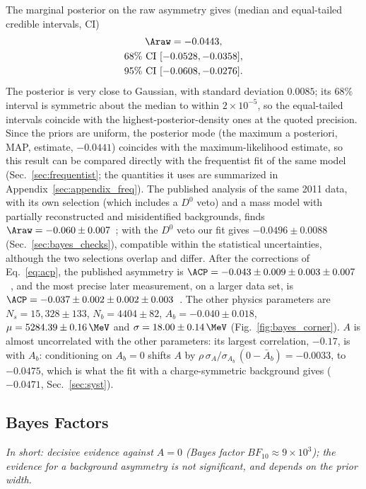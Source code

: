 The marginal posterior on the raw asymmetry gives (median and equal-tailed credible intervals, CI)
\begin{gather*}
\Araw = -0.0443, \\
68\%~\text{CI}~[-0.0528,-0.0358], \\ 95\%~\text{CI}~[-0.0608,-0.0276].
\end{gather*}
The posterior is very close to Gaussian, with standard deviation $0.0085$; its 68\% interval is symmetric about the median to within $2\times10^{-5}$, so the equal-tailed intervals coincide with the highest-posterior-density ones at the quoted precision. Since the priors are uniform, the posterior mode (the maximum a posteriori, MAP, estimate, $-0.0441$) coincides with the maximum-likelihood estimate, so this result can be compared directly with the frequentist fit of the same model (Sec.~\ref{sec:frequentist}; the quantities it uses are summarized in Appendix~\ref{sec:appendix_freq}). The published analysis of the same 2011 data, with its own selection (which includes a $D^0$ veto) and a mass model with partially reconstructed and misidentified backgrounds, finds $\Araw=-0.060\pm0.007$~\cite{lhcb_cpv_2013}; with the $D^0$ veto our fit gives $-0.0496\pm0.0088$ (Sec.~\ref{sec:bayes_checks}), compatible within the statistical uncertainties, although the two selections overlap and differ. After the corrections of Eq.~\eqref{eq:acp}, the published asymmetry is $\ACP=-0.043\pm0.009\pm0.003\pm0.007$~\cite{lhcb_cpv_2013}, and the most precise later measurement, on a larger data set, is $\ACP=-0.037\pm0.002\pm0.002\pm0.003$~\cite{lhcb_cpv_prd2023,lhcb_cpv_paper}. The other physics parameters are $N_s=15{,}328\pm133$, $N_b=4404\pm82$, $A_b=-0.040\pm0.018$, $\mu=5284.39\pm0.16\,\MeV$ and $\sigma=18.00\pm0.14\,\MeV$ (Fig.~\ref{fig:bayes_corner}). $A$ is almost uncorrelated with the other parameters: its largest correlation, $-0.17$, is with $A_b$: conditioning on $A_b=0$ shifts $A$ by $\rho\,\sigma_A/\sigma_{A_b}\,(0-\bar A_b)=-0.0033$, to $-0.0475$, which is what the fit with a charge-symmetric background gives ($-0.0471$, Sec.~\ref{sec:syst}).



\subsection{Bayes Factors}
\label{sec:bayes_factor}
\emph{In short: decisive evidence against $A=0$ (Bayes factor $BF_{10}\approx9\times10^3$); the evidence for a background asymmetry is not significant, and depends on the prior width.}

